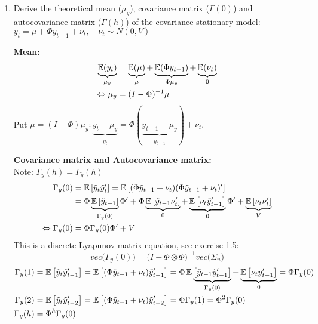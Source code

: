 \begin{enumerate}
\item Derive the theoretical mean ($\mu_y$), covariance matrix ($\Gamma(0)$) and autocovariance matrix ($\Gamma(h)$) of the covariance stationary \varp[1]{} model: $y_t = \mu + \Phi y_{t-1} + \nu_t, \quad \nu_t \sim N(0, V)$

\begin{sol}
    \textbf{Mean:} \\
    \begin{align*}
        \underbrace{\operatorname*{\mathbb{E}}(y_t)}_{\mu_y}
        & = \underbrace{\operatorname*{\mathbb{E}}(\mu)}_{\mu}
        + \underbrace{\operatorname*{\mathbb{E}}(\Phi y_{t-1})}_{\Phi \mu_y}
        + \underbrace{\operatorname*{\mathbb{E}}(\nu_t)}_{0}
        \\
        \Leftrightarrow \mu_y      
        & = (I - \Phi)^{-1} \mu
    \end{align*}
    Put $\mu = (I - \Phi) \mu_y:
    \underbrace{y_t -\mu_y}_{ \tilde{y}_{t}}
    = \Phi (\underbrace{y_{t-1} - \mu_y}_{\tilde{y}_{t-1}})
    + \nu_t$.


    \textbf{Covariance matrix and Autocovariance matrix:} \\
    Note: $\Gamma_y(h) = \Gamma_{\tilde{y}}(h)$
    \begin{align*}
        \Gamma_y(0)
        & = \operatorname*{\mathbb{E}}\left[\tilde{y}_t \tilde{y}_t'\right]
        = \operatorname*{\mathbb{E}}\left[(\Phi \tilde{y}_{t-1} + \nu_t)(\Phi \tilde{y}_{t-1} + \nu_t)'\right]
        \\
        & = \Phi \underbrace{\operatorname*{\mathbb{E}}\left[\tilde{y}_{t-1}\right]}_{\Gamma_y(0)} \Phi'
        + \Phi \underbrace{\operatorname*{\mathbb{E}}\left[\tilde{y}_{t-1}\nu_t'\right]}_{0}
        + \underbrace{\operatorname*{\mathbb{E}}\left[\nu_t \tilde{y}_{t-1}'\right]}_{0} \Phi'
        + \underbrace{\operatorname*{\mathbb{E}}\left[\nu_t \nu_t'\right]}_{V}
        \\
        \Leftrightarrow \Gamma_y(0)
        & = \Phi \Gamma_y(0) \Phi' + V
    \end{align*}
    This is a discrete Lyapunov matrix equation, see exercise 1.5:
    \[
        vec\bigg( \Gamma_y(0) \bigg)
        = \bigg( I - \Phi \otimes \Phi \bigg)^{-1} vec\bigg( \Sigma_u \bigg)
    \]
    \begin{align*}
        \Gamma_y(1)
        & = \operatorname*{\mathbb{E}}\left[\tilde{y}_t \tilde{y}_{t-1}'\right]
        = \operatorname*{\mathbb{E}}\left[(\Phi \tilde{y}_{t-1} + \nu_t)\tilde{y}_{t-1}'\right]
        = \Phi \operatorname*{\mathbb{E}}\underbrace{
            \left[\tilde{y}_{t-1}\tilde{y}_{t-1}'\right]
        }_{\Gamma_y(0)}
        + \underbrace{\operatorname*{\mathbb{E}}\left[\nu_t y_{t-1}'\right]}_{0}
        = \Phi \Gamma_y(0)
        \\
        \Gamma_y(2)
        & =  \operatorname*{\mathbb{E}}\left[\tilde{y}_t \tilde{y}_{t-2}'\right]
        = \operatorname*{\mathbb{E}}\left[(\Phi \tilde{y}_{t-1} + \nu_t)\tilde{y}_{t-2}'\right]
        = \Phi \Gamma_y(1) = \Phi^2 \Gamma_y(0)
        \\
        \Gamma_y(h)
        & = \Phi^h \Gamma_y(0)
    \end{align*}
\end{sol}


\end{enumerate}
